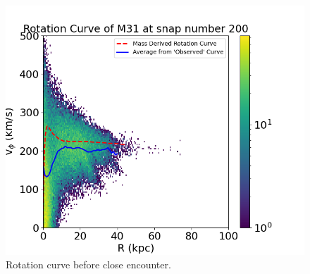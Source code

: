 \documentclass[twocolumn,linenumbers,trackchanges]{aastex7}
\begin{document}





{}


\appendixname

\begin{figure}[ht!]
	\centering
	\includegraphics[width=1.0\linewidth]{M31_200_rotation_curve.png}
	\caption{Rotation curve before close encounter.}
\end{figure}
\end{document}
